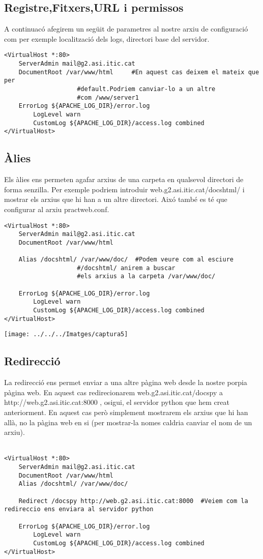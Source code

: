 \documentclass[11p]{article}
\begin{document}
\subsection{Registre,Fitxers,URL i permissos}
A continuacó afegirem un següit de parametres al nostre arxiu de configuració com per exemple localització dels logs, directori base del servidor.
\begin{lstlisting}
<VirtualHost *:80>
	ServerAdmin mail@g2.asi.itic.cat
	DocumentRoot /var/www/html     #En aquest cas deixem el mateix que per 
					#default.Podriem canviar-lo a un altre 
					#com /www/server1
	ErrorLog ${APACHE_LOG_DIR}/error.log
    	LogLevel warn
    	CustomLog ${APACHE_LOG_DIR}/access.log combined
</VirtualHost>
\end{lstlisting}

\subsection{Àlies}
Els àlies ens permeten agafar arxius de una carpeta en qualsevol directori de forma senzilla. Per exemple podriem introduir web.g2.asi.itic.cat/docshtml/ i mostrar els arxius que hi han a un altre directori. Aixó també es té que configurar al arxiu practweb.conf.
\begin{lstlisting}
<VirtualHost *:80>
	ServerAdmin mail@g2.asi.itic.cat
	DocumentRoot /var/www/html     
	
	Alias /docshtml/ /var/www/doc/	#Podem veure com al esciure 
					#/docshtml/ anirem a buscar 
					#els arxius a la carpeta /var/www/doc/
	
	ErrorLog ${APACHE_LOG_DIR}/error.log
    	LogLevel warn
    	CustomLog ${APACHE_LOG_DIR}/access.log combined
</VirtualHost>
\end{lstlisting}
\centerline{\texttt{[image: ../../../Imatges/captura5]} }

\subsection{Redirecció}
La redirecció ens permet enviar a una altre pàgina web desde la nostre porpia pàgina web. En aquest cas redirecionarem web.g2.asi.itic.cat/docspy a http://web.g2.asi.itic.cat:8000 , osigui, el servidor python que hem creat anteriorment. En aquest cas però simplement mostrarem els arxius que hi han allà, no la pàgina web en si (per mostrar-la nomes caldria canviar el nom de un arxiu).\\\\
\begin{lstlisting}
<VirtualHost *:80>
	ServerAdmin mail@g2.asi.itic.cat
	DocumentRoot /var/www/html     
	Alias /docshtml/ /var/www/doc/	
	
	Redirect /docspy http://web.g2.asi.itic.cat:8000  #Veiem com la redireccio ens enviara al servidor python	
	
	ErrorLog ${APACHE_LOG_DIR}/error.log
    	LogLevel warn
    	CustomLog ${APACHE_LOG_DIR}/access.log combined
</VirtualHost>
\end{lstlisting}
\end{document}
